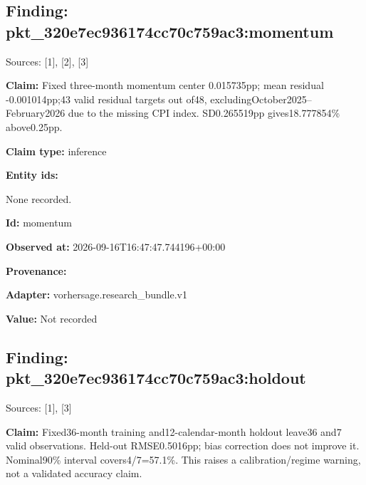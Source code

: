 \documentclass[11pt]{article}
\begin{document}
\subsection*{\textcolor{epdarkgreen}{Finding: pkt\_320e7ec9\hspace{0pt}36174cc70c75\hspace{0pt}9ac3:momentu\hspace{0pt}m}}
Sources: [1], [2], [3]


\par\noindent\textbf{Claim:} Fixed three-month momentum center 0.015735pp; mean residual -0.001014pp;43 valid residual targets out of48, excludingOct\hspace{0pt}ober2025–Feb\hspace{0pt}ruary2026 due to the missing CPI index. SD0.265519pp gives18.777854\% above0.25pp.

\par\noindent\textbf{Claim type:} inference

\par\noindent\textbf{Entity ids:} \par None recorded.

\par\noindent\textbf{Id:} momentum

\par\noindent\textbf{Observed at:} 2026-09-16T1\hspace{0pt}6:47:47.7441\hspace{0pt}96+00:00

\par\noindent\textbf{Provenance:} \par \par\noindent\textbf{Adapter:} vorhersage.r\hspace{0pt}esearch\_bund\hspace{0pt}le.v1

\par\noindent\textbf{Value:} Not recorded

\subsection*{\textcolor{epdarkgreen}{Finding: pkt\_320e7ec9\hspace{0pt}36174cc70c75\hspace{0pt}9ac3:holdout}}
Sources: [1], [3]


\par\noindent\textbf{Claim:} Fixed36-month training and12-calendar-month holdout leave36 and7 valid observations. Held-out RMSE0.5016pp; bias correction does not improve it. Nominal90\% interval covers4/7=57.1\%. This raises a calibration/regime warning, not a validated accuracy claim.
\end{document}
